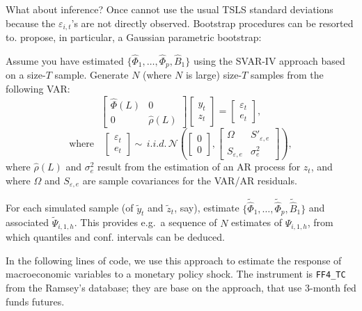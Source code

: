\documentclass[
  12pt,
]{book}
\theoremstyle{definition}
\theoremstyle{definition}
\theoremstyle{definition}
\theoremstyle{definition}
\theoremstyle{remark}
\begin{document}
What about inference? Once cannot use the usual TSLS standard deviations because the \(\varepsilon_{i,t}\)'s are not directly observed. Bootstrap procedures can be resorted to. \citet{Stock_Watson_2018} propose, in particular, a Gaussian parametric bootstrap:

Assume you have estimated \(\{\widehat{\Phi}_1,\dots,\widehat{\Phi}_p,\widehat{B}_1\}\) using the SVAR-IV approach based on a size-\(T\) sample. Generate \(N\) (where \(N\) is large) size-\(T\) samples from the following VAR:
\[
\left[
\begin{array}{cc}
\widehat{\Phi}(L) & 0 \\
0 & \widehat{\rho}(L)
\end{array}
\right]
\left[
\begin{array}{c}
y_t \\
z_t
\end{array}
\right] =
\left[
\begin{array}{c}
\varepsilon_t \\
e_t
\end{array}
\right],
\]
\[
\mbox{where} \quad \left[
\begin{array}{c}
\varepsilon_t \\
e_t
\end{array}
\right]\sim \, i.i.d.\,\mathcal{N}\left(\left[\begin{array}{c}0\\0\end{array}\right],
\left[\begin{array}{cc}
\Omega & S'_{\varepsilon,e}\\
S_{\varepsilon,e}& \sigma^2_{e}
\end{array}\right]
\right),
\]
where \(\widehat{\rho}(L)\) and \(\sigma^2_{e}\) result from the estimation of an AR process for \(z_t\), and where \(\Omega\) and \(S_{\varepsilon,e}\) are sample covariances for the VAR/AR residuals.

For each simulated sample (of \(\tilde{y}_t\) and \(\tilde{z}_t\), say), estimate \(\{\widetilde{\widehat{\Phi}}_1,\dots,\widetilde{\widehat{\Phi}}_p,\widetilde{\widehat{B}}_1\}\) and associated \(\widetilde{\Psi}_{i,1,h}\). This provides e.g.~a sequence of \(N\) estimates of \(\Psi_{i,1,h}\), from which quantiles and conf. intervals can be deduced.

In the following lines of code, we use this approach to estimate the response of macroeconomic variables to a monetary policy shock. The instrument is \texttt{FF4\_TC} from the Ramsey's database; they are base on the \citet{Gertler_Karadi_2015} approach, that use 3-month fed funds futures.
\end{document}
